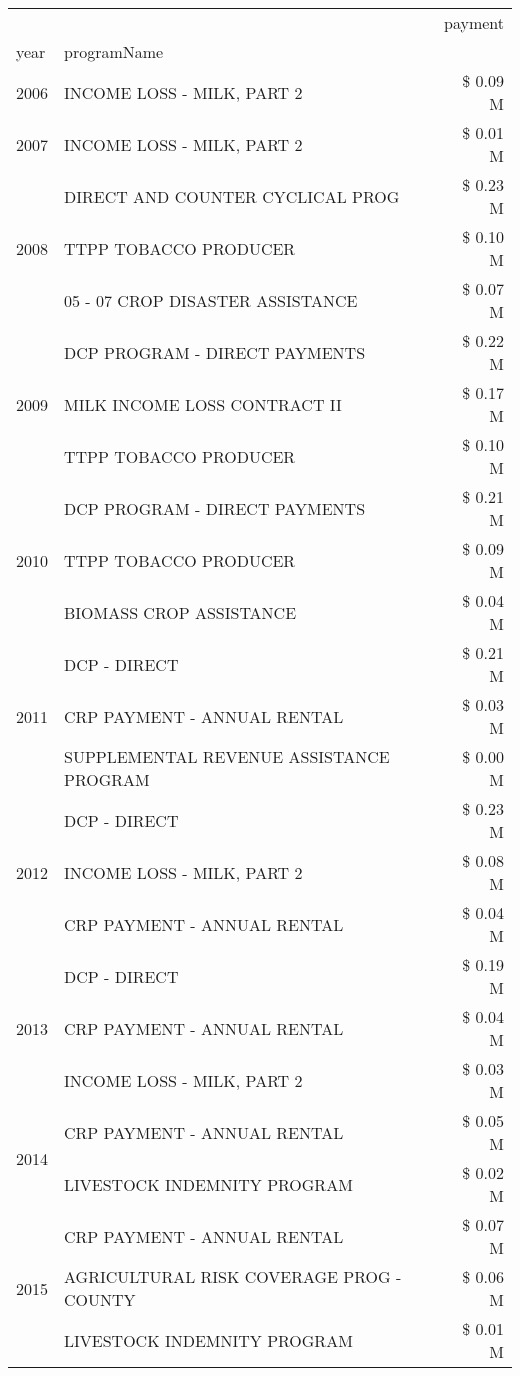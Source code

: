 \begin{tabular}{llr}
\toprule
 &  & payment \\
year & programName &  \\
\midrule
2006 & INCOME LOSS - MILK, PART 2 & \$ 0.09 M \\
\cline{1-3}
2007 & INCOME LOSS - MILK, PART 2 & \$ 0.01 M \\
\cline{1-3}
\multirow[t]{3}{*}{2008} & DIRECT AND COUNTER CYCLICAL PROG & \$ 0.23 M \\
 & TTPP TOBACCO PRODUCER & \$ 0.10 M \\
 & 05 - 07 CROP DISASTER ASSISTANCE & \$ 0.07 M \\
\cline{1-3}
\multirow[t]{3}{*}{2009} & DCP PROGRAM - DIRECT PAYMENTS & \$ 0.22 M \\
 & MILK INCOME LOSS CONTRACT II & \$ 0.17 M \\
 & TTPP TOBACCO PRODUCER & \$ 0.10 M \\
\cline{1-3}
\multirow[t]{3}{*}{2010} & DCP PROGRAM - DIRECT PAYMENTS & \$ 0.21 M \\
 & TTPP TOBACCO PRODUCER & \$ 0.09 M \\
 & BIOMASS CROP ASSISTANCE & \$ 0.04 M \\
\cline{1-3}
\multirow[t]{3}{*}{2011} & DCP - DIRECT & \$ 0.21 M \\
 & CRP PAYMENT - ANNUAL RENTAL & \$ 0.03 M \\
 & SUPPLEMENTAL REVENUE ASSISTANCE PROGRAM & \$ 0.00 M \\
\cline{1-3}
\multirow[t]{3}{*}{2012} & DCP - DIRECT & \$ 0.23 M \\
 & INCOME LOSS - MILK, PART 2 & \$ 0.08 M \\
 & CRP PAYMENT - ANNUAL RENTAL & \$ 0.04 M \\
\cline{1-3}
\multirow[t]{3}{*}{2013} & DCP - DIRECT & \$ 0.19 M \\
 & CRP PAYMENT - ANNUAL RENTAL & \$ 0.04 M \\
 & INCOME LOSS - MILK, PART 2 & \$ 0.03 M \\
\cline{1-3}
\multirow[t]{2}{*}{2014} & CRP PAYMENT - ANNUAL RENTAL & \$ 0.05 M \\
 & LIVESTOCK INDEMNITY PROGRAM & \$ 0.02 M \\
\cline{1-3}
\multirow[t]{3}{*}{2015} & CRP PAYMENT - ANNUAL RENTAL & \$ 0.07 M \\
 & AGRICULTURAL RISK COVERAGE PROG - COUNTY & \$ 0.06 M \\
 & LIVESTOCK INDEMNITY PROGRAM & \$ 0.01 M \\

\end{tabular}
